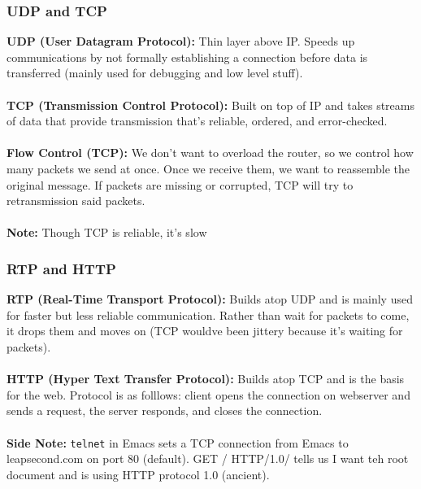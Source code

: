 \documentclass[13pt]{article}
\begin{document}
\subsubsection{UDP and TCP}
\textbf{UDP (User Datagram Protocol):} Thin layer above IP. Speeds up communications by not formally establishing a connection before data is transferred (mainly used for debugging and low level stuff). \\ \\
\textbf{TCP (Transmission Control Protocol):} Built on top of IP and takes streams of data that provide transmission that's reliable, ordered, and error-checked. \\ \\
\textbf{Flow Control (TCP):} We don't want to overload the router, so we control how many packets we send at once. Once we receive them, we want to reassemble the original message. If packets are missing or corrupted, TCP will try to retransmission said packets. \\ \\
\textbf{Note:} Though TCP is reliable, it's slow

\subsubsection{RTP and HTTP}
\textbf{RTP (Real-Time Transport Protocol):} Builds atop UDP and is mainly used for faster but less reliable communication. Rather than wait for packets to come, it drops them and moves on (TCP wouldve been jittery because it's waiting for packets). \\ \\
\textbf{HTTP (Hyper Text Transfer Protocol):} Builds atop TCP and is the basis for the web. Protocol is as folllows: client opens the connection on webserver and sends a request, the server responds, and closes the connection. \\ \\
\textbf{Side Note:} \texttt{telnet} in Emacs sets a TCP connection from Emacs to leapsecond.com on port 80 (default). GET / HTTP/1.0/ tells us I want teh root document and is using HTTP protocol 1.0 (ancient). 
\end{document}
